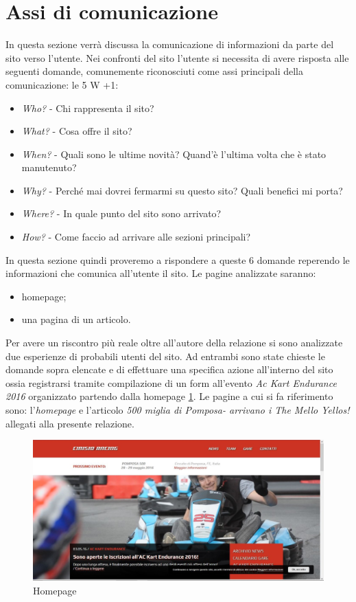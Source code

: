 
\section{Assi di comunicazione}
	In questa sezione verrà discussa la comunicazione di informazioni da parte del sito verso l'utente. Nei confronti del sito l'utente si necessita di avere risposta alle seguenti domande, comunemente riconosciuti come assi principali della comunicazione: le 5 W +1:
	\begin{itemize}
		\item \textit{Who?} - Chi rappresenta il sito?
		\item \textit{What?} - Cosa offre il sito?
		\item \textit{When?} - Quali sono le ultime novità? Quand'è l'ultima volta che è stato manutenuto?
		\item \textit{Why?} - Perché mai dovrei fermarmi su questo sito? Quali benefici mi porta?
		\item \textit{Where?} - In quale punto del sito sono arrivato?
		\item \textit{How?} - Come faccio ad arrivare alle sezioni principali?
\end{itemize}	 

In questa sezione quindi proveremo a rispondere a queste 6 domande reperendo le informazioni che comunica all'utente il sito. 
	Le pagine analizzate saranno:
		\begin{itemize}
			\item homepage;
			\item una pagina di un articolo.
		\end{itemize}
		
		Per avere un riscontro più reale oltre all'autore della relazione si sono analizzate due esperienze di probabili utenti del sito. Ad entrambi sono state chieste le domande sopra elencate e di effettuare una specifica azione all'interno del sito ossia registrarsi tramite compilazione di un form all'evento \textit{Ac Kart Endurance 2016} organizzato partendo dalla homepage \ref{fig:Homepage_0}. Le pagine a cui si fa riferimento sono: l'\textit{homepage} e l'articolo \textit{500 miglia di Pomposa- arrivano i The Mello Yellos!} allegati alla presente relazione.
		
		\begin{figure} [h]
			\centering
			\includegraphics[width=\textwidth]{images/Homepage_0}
			\caption{Homepage}
			\label{fig:Homepage_0}
		\end{figure}
		

